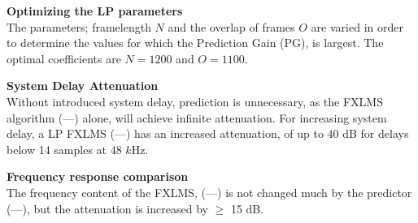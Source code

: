 \large

\begin{minipage}{.43\columnwidth}
 \textbf{Optimizing the LP parameters}\\
 	The parameters; framelength $N$ and the overlap of frames $O$ are varied in order to determine the values for which the Prediction Gain (PG), is largest. The optimal coefficients are $N=1200$ and $O=1100$.
	\label{fig:HammingNOP10}
\end{minipage}%
\hspace{4mm}
\begin{minipage}[]{0.5\columnwidth}
	
\end{minipage}

\vspace{4mm}
\begin{minipage}{.43\columnwidth}
	\textbf{System Delay Attenuation}\\
Without introduced system delay, prediction is unnecessary, as the FXLMS algorithm (\textcolor{MATLABblue}{---}) alone, will achieve infinite attenuation. For increasing system delay, a LP FXLMS (\textcolor{MATLABred}{---}) has an increased attenuation, of up to 40 dB for delays below 14 samples at 48 $k$Hz.

\end{minipage}%
\hspace{4mm}
\begin{minipage}{0.5\columnwidth}
	
\end{minipage}
\vspace{4mm}

\begin{minipage}{.43\columnwidth}
\textbf{Frequency response comparison}\\
The frequency content of the FXLMS, (\textcolor{MATLABblue}{---}) is not changed much by the predictor (\textcolor{MATLABred}{---}), but the attenuation is increased by $\geq$ 15 dB. 
\end{minipage}%
\hspace{4mm}
\begin{minipage}{0.5\columnwidth}
	
\end{minipage}
